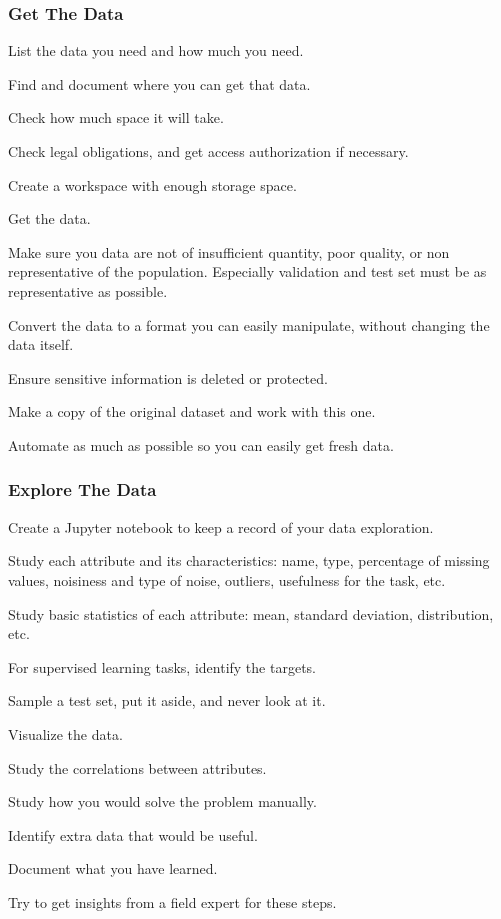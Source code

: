 \subsubsection*{Get The Data}
\bit
\item List the data you need and how much you need.
\item Find and document where you can get that data.
\item Check how much space it will take.
\item Check legal obligations, and get access authorization if necessary.
\item Create a workspace with enough storage space.
\item Get the data.
\item Make sure you data are not of insufficient quantity, poor quality, or non representative of the population.
Especially validation and test set must be as representative as possible.
\item Convert the data to a format you can easily manipulate, without changing the data itself.
\item Ensure sensitive information is deleted or protected.
\item Make a copy of the original dataset and work with this one.
\item Automate as much as possible so you can easily get fresh data.
\eit

\subsubsection*{Explore The Data}
\bit
\item Create a Jupyter notebook to keep a record of your data exploration.
\item Study each attribute and its characteristics: name, type, percentage of missing values, noisiness and type of
noise, outliers, usefulness for the task, etc.
\item Study basic statistics of each attribute: mean, standard deviation, distribution, etc.
\item For supervised learning tasks, identify the targets.
\item Sample a test set, put it aside, and never look at it.
\item Visualize the data.
\item Study the correlations between attributes.
\item Study how you would solve the problem manually.
\item Identify extra data that would be useful.
\item Document what you have learned.
\item Try to get insights from a field expert for these steps.
\eit

